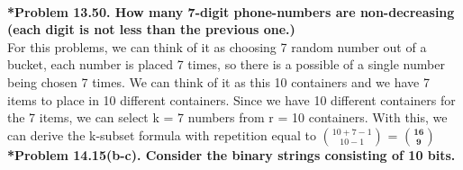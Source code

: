 \documentclass{article}
\begin{document}
    \noindent\\[0.25in]
    \noindent \textbf{*Problem 13.50. How many 7-digit phone-numbers are non-decreasing (each digit is not less than the previous one.)}
    \\ For this problems, we can think of it as choosing 7 random number out of a bucket, each number is placed 7 times, so there is a possible of a single number being chosen
    7 times. We can think of it as this 10 containers and we have 7 items to place in 10 different containers. Since we have 10 different containers for the 7 items, we can select 
    k = 7 numbers from r = 10 containers. With this, we can derive the k-subset formula with repetition equal to ${10 + 7 - 1 \choose 10 - 1}$ = {\LARGE $\boxed{\mathbf{16 \choose 9}}$}
    \noindent\\[0.25in]
    \noindent \textbf{*Problem 14.15(b-c). Consider the binary strings consisting of 10 bits.}
\end{document}
